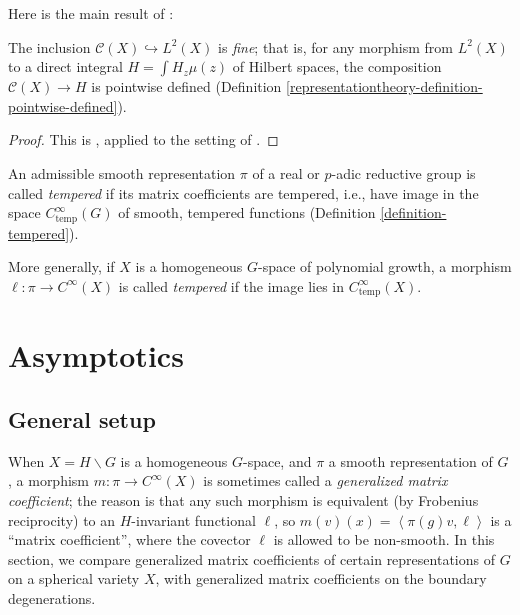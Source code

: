 Here is the main result of \cite{Bernstein-Plancherel}:

\begin{theorem}
 \label{theorem-Bernstein-Plancherel}
The inclusion $\mathcal C(X)\hookrightarrow L^2(X)$ is {\it fine}; that is, for any morphism from $L^2(X)$ to a direct integral $H=\int H_z \mu(z)$ of Hilbert spaces, the composition $\mathcal C(X)\to H$ is pointwise defined (Definition \ref{representationtheory-definition-pointwise-defined}). 
\end{theorem}


\begin{proof}
 This is \cite[Theorem 3.2]{Bernstein-Plancherel}, applied to the setting of \cite[\S 3.5, 3.7]{Bernstein-Plancherel}.
\end{proof}

\begin{definition}
 \label{definition-tempered-representation}
An admissible smooth representation $\pi$ of a real or $p$-adic reductive group is called {\it tempered} if its matrix coefficients are tempered, i.e., have image in the space $C^\infty_{\text{temp}}(G)$ of smooth, tempered functions (Definition \ref{definition-tempered}).

More generally, if $X$ is a homogeneous $G$-space of polynomial growth, a morphism $\ell:\pi\to C^\infty(X)$ is called {\it tempered} if the image lies in $C^\infty_{\text{temp}}(X)$.
\end{definition}









\section{Asymptotics}
\label{section-asymptotics}

\subsection{General setup}
\label{subsection-asymptotics-setup}

When $X = H\backslash G$ is a homogeneous $G$-space, and $\pi$ a smooth representation of $G$, a morphism $m:\pi\to C^\infty(X)$ is sometimes called a \emph{generalized matrix coefficient}; the reason is that any such morphism is equivalent (by Frobenius reciprocity) to an $H$-invariant functional $\ell$, so $m(v)(x) = \left< \pi(g) v, \ell \right>$ is a ``matrix coefficient'', where the covector $\ell$ is allowed to be non-smooth. In this section, we compare generalized matrix coefficients of certain representations of $G$ on a spherical variety $X$, with generalized matrix coefficients on the boundary degenerations. 

